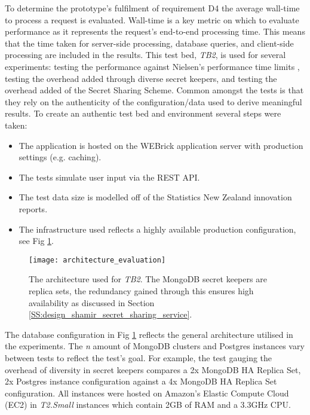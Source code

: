 To determine the prototype's fulfilment of requirement D4 the average wall-time to process a request is evaluated. Wall-time is a key metric on which to evaluate performance as it represents the request's end-to-end processing time. This means that the time taken for server-side processing, database queries, and client-side processing are included in the results. This test bed, \textit{TB2}, is used for several experiments: testing the performance against Nielsen's performance time limits \cite{Responsetime:online}, testing the overhead added through diverse secret keepers, and testing the overhead added of the Secret Sharing Scheme. Common amongst the tests is that they rely on the authenticity of the configuration/data used to derive meaningful results. To create an authentic test bed and environment several steps were taken:
\begin{itemize}  
    \item The application is hosted on the WEBrick application server with production settings (e.g. caching).
    \item The tests simulate user input via the REST API.
    \item The test data size is modelled off of the Statistics New Zealand innovation reports.
    \item The infrastructure used reflects a highly available production configuration, see Fig \ref{fig:architecture_evaluation}.
\end{itemize}

\begin{figure}[ht]
    \centering
    \texttt{[image: architecture\_evaluation]}
    \caption{The architecture used for \textit{TB2}. The MongoDB secret keepers are replica sets, the redundancy gained through this ensures high availability as discussed in Section \ref{SS:design_shamir_secret_sharing_service}.}
    \label{fig:architecture_evaluation}
\end{figure}

The database configuration in Fig \ref{fig:architecture_evaluation} reflects the general architecture utilised in the experiments. The \textit{n} amount of MongoDB clusters and Postgres instances vary between tests to reflect the test's goal. For example, the test gauging the overhead of diversity in secret keepers compares a 2x MongoDB HA Replica Set, 2x Postgres instance configuration against a 4x MongoDB HA Replica Set configuration. All instances were hosted on Amazon's Elastic Compute Cloud (EC2) in \textit{T2.Small} instances which contain 2GB of RAM and a 3.3GHz CPU.

